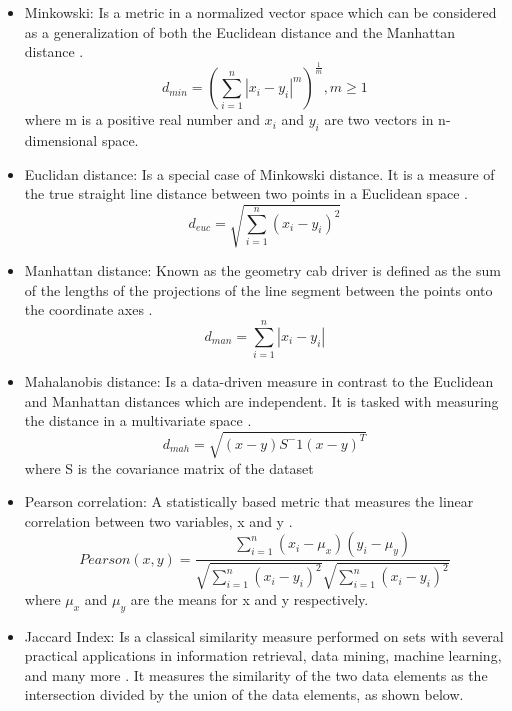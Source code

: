 \begin{itemize}
  \item Minkowski: Is a metric in a normalized vector space which can be considered as a generalization of both the Euclidean distance and the Manhattan distance \citep{b56}.
    \begin{equation}
        d_{min} = (\sum_{i=1}^{n}|x_i - y_i|^m)^\frac{1}{m}, m\geq 1
    \end{equation}
    where m is a positive real number and $x_i$ and $y_i$ are two vectors in n-dimensional space.
    \item Euclidan distance: Is a special case of Minkowski distance. It is a measure of the true straight line distance between two points in a Euclidean space \citep{b19}.
    \begin{equation}
        d_{euc} =  \sqrt{\sum_{i=1}^{n}(x_{i}-y_{i})^2}
    \end{equation}
     \item Manhattan distance: Known as the geometry cab driver is defined as the
sum of the lengths of the projections of the line segment between the points onto the coordinate axes \citep{b58}.
     \begin{equation}
        d_{man} =  \sum_{i=1}^{n}|x_{i}-y_{i}|
    \end{equation}
    \item Mahalanobis distance: Is a data-driven measure in contrast to the Euclidean and Manhattan distances which are independent. It is tasked with measuring the distance in a multivariate space \citep{b58}.
    \begin{equation}
        d_{mah}= \sqrt{(x-y)S^-1(x-y)^T}
    \end{equation}
    where S is the covariance matrix of the dataset
    \item Pearson correlation: A statistically based metric that measures the linear correlation between two variables, x and y \citep{b61}.
    \begin{equation}
        Pearson(x,y)= \frac{\sum_{i=1}^n(x_i-\mu_x)(y_i-\mu_y)}{\sqrt{\sum_{i=1}^n(x_i-y_i)^2}\sqrt{\sum_{i=1}^n(x_i-y_i)^2}}
    \end{equation}
    where $\mu_x$ and $\mu_y$ are the means for x and y respectively.
    \item Jaccard Index: Is a classical similarity measure performed on sets with several practical applications in information retrieval, data mining, machine learning, and many more \citep{b35} \citep{b59}. It measures the similarity of the two data elements as the intersection divided by the union of the data elements, as shown below.

\end{itemize}
